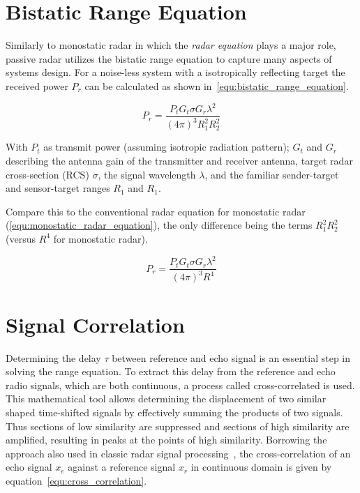 \section{Bistatic Range Equation}

Similarly to monostatic radar in which the \emph{radar equation} plays a major role, passive radar utilizes the bistatic range equation to capture many aspects of systems design. For a noise-less system with a isotropically reflecting target the received power \(P_{r}\) can be calculated as shown in~\ref{equ:bistatic_range_equation}.~\cite[p.~20]{Malanowski2019}

\begin{equation}\label{equ:bistatic_range_equation}
    P_{r} = \frac{P_{t} G_{t} \sigma G_{r} \lambda^2}{{\left(4 \pi \right)}^3 R_{1}^2 R_{2}^2}
\end{equation}

With \(P_{t}\) as transmit power (assuming isotropic radiation pattern); \(G_{t}\) and \(G_{r}\) describing the antenna gain of the transmitter and receiver antenna, target radar cross-section (RCS) \(\sigma\), the signal wavelength \(\lambda\), and the familiar sender-target and sensor-target ranges \(R_{1}\) and \(R_{1}\).

Compare this to the conventional radar equation for monostatic radar (\ref{equ:monostatic_radar_equation}), the only difference being the terms \(R_{1}^2 R_{2}^2\) (versus \(R^4\) for monostatic radar).~\cite[p.~4]{Kloeck2019}

\begin{equation}\label{equ:monostatic_radar_equation}
    P_{r} = \frac{P_{t} G_{t} \sigma G_{r} \lambda^2}{{\left(4 \pi \right)}^3 R^4}
\end{equation}

\section{Signal Correlation}

Determining the delay \(\tau\) between reference and echo signal is an essential step in solving the range equation. To extract this delay from the reference and echo radio signals, which are both continuous, a process called cross-correlated is used. This mathematical tool allows determining the displacement of two similar shaped time-shifted signals by effectively summing the products of two signals. Thus sections of low similarity are suppressed and sections of high similarity are amplified, resulting in peaks at the points of high similarity. Borrowing the approach also used in classic radar signal processing~\cite{Richards2014}, the cross-correlation of an echo signal \(x_e\) against a reference signal \(x_r\) in continuous domain is given by equation~\ref{equ:cross_correlation}.

